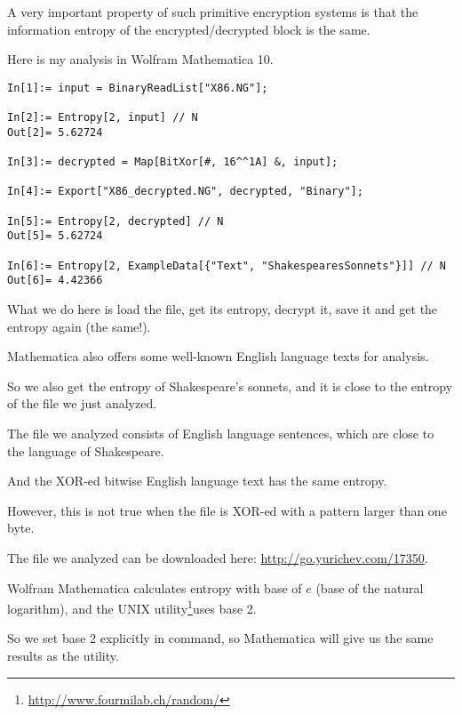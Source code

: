 A very important property of such primitive encryption systems is that the information entropy
of the encrypted/decrypted block is the same.

Here is my analysis in Wolfram Mathematica 10.

\begin{lstlisting}[caption=Wolfram Mathematica 10]
In[1]:= input = BinaryReadList["X86.NG"];

In[2]:= Entropy[2, input] // N
Out[2]= 5.62724

In[3]:= decrypted = Map[BitXor[#, 16^^1A] &, input];

In[4]:= Export["X86_decrypted.NG", decrypted, "Binary"];

In[5]:= Entropy[2, decrypted] // N
Out[5]= 5.62724

In[6]:= Entropy[2, ExampleData[{"Text", "ShakespearesSonnets"}]] // N
Out[6]= 4.42366
\end{lstlisting}

What we do here is load the file, get its entropy, decrypt it, save it and get the entropy again (the same!).

Mathematica also offers some well-known English language texts for analysis.

So we also get the entropy of Shakespeare's sonnets, and it is close to the entropy of the file we just analyzed.

The file we analyzed consists of English language sentences, which are close to the language 
of Shakespeare.

And the XOR-ed bitwise English language text has the same entropy.

However, this is not true when the file is XOR-ed with a pattern larger than one byte.

The file we analyzed can be downloaded here: \url{http://go.yurichev.com/17350}.


\newcommand{\FNENTURL}{\footnote{\url{http://www.fourmilab.ch/random/}}}

Wolfram Mathematica calculates entropy with base of $e$ (base of the natural logarithm),
and the UNIX  utility\FNENTURL uses base 2.

So we set base 2 explicitly in  command, so Mathematica will give us the same results as the  utility.

